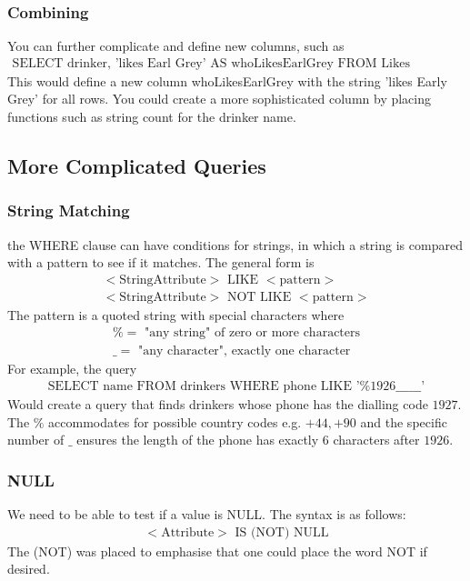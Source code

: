 \documentclass[a4paper]{article}
\theoremstyle{plain}
\theoremstyle{definition}
\theoremstyle{remark}
\begin{document}
\subsubsection{Combining}
You can further complicate and define new columns, such as
\begin{align*}
	\text{SELECT drinker, 'likes Earl Grey' AS whoLikesEarlGrey FROM Likes WHERE tea = 'Earl Grey';}
\end{align*}
This would define a new column whoLikesEarlGrey with the string 'likes Early Grey' for all rows. You could create a more sophisticated column by placing functions such as string count for the drinker name. 
\subsection{More Complicated Queries}
\subsubsection{String Matching}
the WHERE clause can have conditions for strings, in which a string is compared with a pattern to see if it matches. The general form is
\begin{align*}
	<\text{StringAttribute}> \text{ LIKE } <\text{pattern}> \\
	<\text{StringAttribute}> \text{ NOT LIKE } <\text{pattern}>
\end{align*}
The pattern is a quoted string with special characters where
\begin{align*}
	\% = \text{ "any string" of zero or more characters} \\
	\_ = \text{ "any character", exactly one character}
\end{align*}
For example, the query
\begin{align*}
	\text{SELECT name FROM drinkers WHERE phone LIKE '$\% 1926 \_\_\_\_\_\_$'}
\end{align*}
Would create a query that finds drinkers whose phone has the dialling code $1927$. The $\%$ accommodates for possible country codes e.g. $+44,+90$ and the specific number of $\_$ ensures the length of the phone has exactly $6$ characters after $1926$.
\subsubsection{NULL}
We need to be able to test if a value is NULL. The syntax is as follows:
\begin{align*}
	<\text{Attribute}> \text{ IS (NOT) NULL}
\end{align*}
The (NOT) was placed to emphasise that one could place the word NOT if desired.
\end{document}
